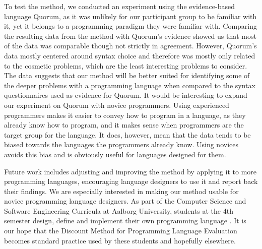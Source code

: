 \documentclass[preprint,10pt]{sigplanconf}
\begin{document}
To test the method, we conducted an experiment using the evidence-based language Quorum, as it was unlikely for our participant group to be familiar with it, yet it belongs to a programming paradigm they were familiar with.
Comparing the resulting data from the method with Quorum’s evidence showed us that most of the data was comparable though not strictly in agreement.
However, Quorum’s data mostly centered around syntax choice and therefore was mostly only related to the cosmetic problems, which are the least interesting problems to consider.
The data suggests that our method will be better suited for identifying some of the deeper problems with a programming language when compared to the syntax questionnaires used as evidence for Quorum.
It would be interesting to expand our experiment on Quorum with novice programmers.
Using experienced programmers makes it easier to convey how to program in a language, as they already know how to program, and it  makes sense when programmers are the target group for the language.
It does, however, mean that the data tends to be biased towards the languages the programmers already know. Using novices avoids this bias and is obviously useful for languages designed for them.





Future work includes adjusting and improving the method by applying it to more programming languages, encouraging language designers to use it and report back their findings.
We are especially interested in making our method usable for novice programming language designers. 
As part of the Computer Science and Software Engineering Curricula at Aalborg University, students at the 4th semester design, define and implement their own programming language \cite{toce2016}. It is our hope that the Discount Method for Programming Language Evaluation becomes standard practice used by these students and hopefully elsewhere.
\end{document}
